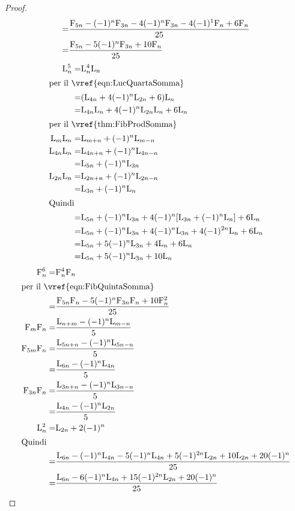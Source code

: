 \begin{proof}
\begin{align*}
	=&{}\dfrac{\mathrm{F}_{5n}-(-1)^{n}\mathrm{F}_{3n}-4(-1)^n\mathrm{F}_{3n}-4(-1)^{1}\mathrm{F}_{n}+6\mathrm{F}_{n}}{25}\\
	=&{}\dfrac{\mathrm{F}_{5n}-5(-1)^n\mathrm{F}_{3n}+10\mathrm{F}_{n}}{25}\\
\end{align*}
\begin{align*}
	\Luc{n}^5=&{}\Luc{n}^4\Luc{n}\\
	\intertext{per il~\vref{eqn:LucQuartaSomma}}
	=&{}(\Luc{4n}+4(-1)^n\Luc{2n}+6)\Luc{n}\\
	=&{}\Luc{4n}\Luc{n}+4(-1)^n\Luc{2n}\Luc{n}+6\Luc{n}\\
	\intertext{per il~\vref{thm:FibProdSomma}}
	\Luc{m}\Luc{n}=&{}\Luc{m+n}+(-1)^{n}\Luc{m-n}\\
	\Luc{4n}\Luc{n}=&{}\Luc{4n+n}+(-1)^{n}\Luc{4n-n}\\
	=&{}\Luc{5n}+(-1)^{n}\Luc{3n}\\
	\Luc{2n}\Luc{n}=&{}\Luc{2n+n}+(-1)^{n}\Luc{2n-n}\\
	=&{}\Luc{3n}+(-1)^{n}\Luc{n}\\
	\intertext{Quindi}
	=&{}\Luc{5n}+(-1)^{n}\Luc{3n}+4(-1)^n[\Luc{3n}+(-1)^{n}\Luc{n}]+6\Luc{n}\\
	=&{}\Luc{5n}+(-1)^{n}\Luc{3n}+4(-1)^n\Luc{3n}+4(-1)^{2n}\Luc{n}+6\Luc{n}\\
	=&{}\Luc{5n}+5(-1)^n\Luc{3n}+4\Luc{n}+6\Luc{n}\\
	=&{}\Luc{5n}+5(-1)^n\Luc{3n}+10\Luc{n}\\
\end{align*}
\begin{align*}
	\Fib{n}^6=&{}\Fib{n}^4\Fib{n}\\
	\intertext{per il~\vref{eqn:FibQuintaSomma}}
	=&{}\dfrac{\Fib{5n}\Fib{n}-5(-1)^n\Fib{3n}\Fib{n}+10\Fib{n}^2}{25}\\
	\Fib{m}\Fib{n}=&{}\dfrac{\Luc{n+m}-(-1)^n\Luc{m-n}}{5}\\
	\Fib{5m}\Fib{n}=&{}\dfrac{\Luc{5n+n}-(-1)^n\Luc{5n-n}}{5}\\
	=&{}\dfrac{\Luc{6n}-(-1)^n\Luc{4n}}{5}\\
	\Fib{3n}\Fib{n}=&{}\dfrac{\Luc{3n+n}-(-1)^n\Luc{3n-n}}{5}\\
	=&{}\dfrac{\Luc{4n}-(-1)^n\Luc{2n}}{5}\\
	\Luc{n}^2=&{}\Luc{2n}+2(-1)^n\\
	\intertext{Quindi}
	=&{}\dfrac{\Luc{6n}-(-1)^n\Luc{4n}-5(-1)^n\Luc{4n}+5(-1)^{2n}\Luc{2n}+10\Luc{2n}+20(-1)^n}{25}\\
	=&{}\dfrac{\Luc{6n}-6(-1)^n\Luc{4n}+15(-1)^{2n}\Luc{2n}+20(-1)^n}{25}\\

\end{align*}
\end{proof}
